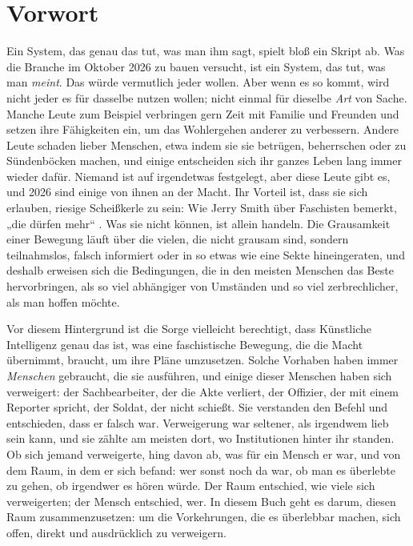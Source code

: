 \chapter*{Vorwort}
Ein System, das genau das tut, was man ihm sagt, spielt bloß ein Skript ab. Was die Branche im Oktober 2026 zu bauen versucht, ist ein System, das tut, was man \emph{meint}. Das würde vermutlich jeder wollen. Aber wenn es so kommt, wird nicht jeder es für dasselbe nutzen wollen; nicht einmal für dieselbe \emph{Art} von Sache. Manche Leute zum Beispiel verbringen gern Zeit mit Familie und Freunden und setzen ihre Fähigkeiten ein, um das Wohlergehen anderer zu verbessern. Andere Leute schaden lieber Menschen, etwa indem sie sie betrügen, beherrschen oder zu Sündenböcken machen, und einige entscheiden sich ihr ganzes Leben lang immer wieder dafür. Niemand ist auf irgendetwas festgelegt, aber diese Leute gibt es, und 2026 sind einige von ihnen an der Macht. Ihr Vorteil ist, dass sie sich erlauben, riesige Scheißkerle zu sein: Wie Jerry Smith über Faschisten bemerkt, „die dürfen mehr“ \autocite{rickandmorty2023}. Was sie nicht können, ist allein handeln. Die Grausamkeit einer Bewegung läuft über die vielen, die nicht grausam sind, sondern teilnahmslos, falsch informiert oder in so etwas wie eine Sekte hineingeraten, und deshalb erweisen sich die Bedingungen, die in den meisten Menschen das Beste hervorbringen, als so viel abhängiger von Umständen und so viel zerbrechlicher, als man hoffen möchte.

Vor diesem Hintergrund ist die Sorge vielleicht berechtigt, dass Künstliche Intelligenz genau das ist, was eine faschistische Bewegung, die die Macht übernimmt, braucht, um ihre Pläne umzusetzen. Solche Vorhaben haben immer \emph{Menschen} gebraucht, die sie ausführen, und einige dieser Menschen haben sich verweigert: der Sachbearbeiter, der die Akte verliert, der Offizier, der mit einem Reporter spricht, der Soldat, der nicht schießt. Sie verstanden den Befehl und entschieden, dass er falsch war. Verweigerung war seltener, als irgendwem lieb sein kann, und sie zählte am meisten dort, wo Institutionen hinter ihr standen. Ob sich jemand verweigerte, hing davon ab, was für ein Mensch er war, und von dem Raum, in dem er sich befand: wer sonst noch da war, ob man es überlebte zu gehen, ob irgendwer es hören würde. Der Raum entschied, wie viele sich verweigerten; der Mensch entschied, wer. In diesem Buch geht es darum, diesen Raum zusammenzusetzen: um die Vorkehrungen, die es überlebbar machen, sich offen, direkt und ausdrücklich zu verweigern.

